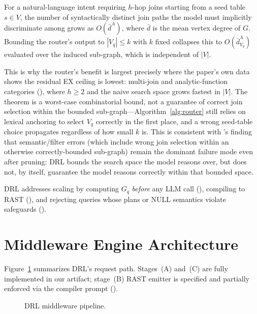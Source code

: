 \documentclass[twocolumn]{svjour3}
\begin{document}
\begin{drthm}
\label{thm:searchspace}
For a natural-language intent requiring $h$-hop joins starting from a seed table $s\in V$, the number of syntactically distinct join paths the model must implicitly discriminate among grows as $O(\bar{d}^{\,h})$, where $\bar{d}$ is the mean vertex degree of $G$.
Bounding the router's output to $|V_q|\le k$ with $k$ fixed collapses this to $O(\bar{d}_{V_q}^{\,h})$ evaluated over the induced sub-graph, which is independent of $|V|$.
\end{drthm}
This is why the router's benefit is largest precisely where the paper's own data shows the residual EX ceiling is lowest: multi-join and analytic-function categories (), where $h\ge 2$ and the naive search space grows fastest in $|V|$.
The theorem is a worst-case combinatorial bound, not a guarantee of correct join selection within the bounded sub-graph---Algorithm~\ref{alg:router} still relies on lexical anchoring to select $V_q$ correctly in the first place, and a wrong seed-table choice propagates regardless of how small $k$ is.
This is consistent with 's finding that semantic/filter errors (which include wrong join selection within an otherwise correctly-bounded sub-graph) remain the dominant failure mode even after pruning: DRL bounds the search space the model reasons over, but does not, by itself, guarantee the model reasons correctly within that bounded space.

DRL addresses scaling by computing $G_q$ \emph{before} any LLM call (), compiling to RAST (), and rejecting queries whose plans or NULL semantics violate safeguards ().

\section{Middleware Engine Architecture}
\label{sec:arch}

Figure~\ref{fig:pipeline} summarizes DRL's request path.
Stages~(A) and~(C) are fully implemented in our artifact; stage~(B) RAST emitter is specified and partially enforced via the compiler prompt ().

\begin{figure}[t]
\centering
{}
\caption{DRL middleware pipeline.}
\label{fig:pipeline}
\end{figure}
\end{document}

